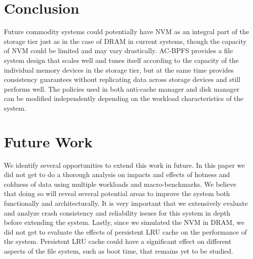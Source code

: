 \section{Conclusion}
\label{sec-conc}

Future commodity systems could potentially have NVM as an integral part of the storage tier just as in the case of DRAM in current systems, though the capacity of NVM could be limited and may vary drastically. AC-BPFS provides a file system design that scales well and tunes itself according to the capacity of the individual memory devices in the storage tier, but at the same time provides consistency guarantees without replicating data across storage devices and still performs well. The policies used in both anti-cache manager and disk manager can be modified independently depending on the workload characteristics of the system.

\section{Future Work}
\label{sec-conc}

We identify several opportunities to extend this work in future. In this paper we did not get to do a thorough analysis on impacts and effects of hotness and coldness of data using multiple workloads and macro-benchmarks. We believe that doing so will reveal several potential areas to improve the system both functionally and architecturally. It is very important that we extensively evaluate and analyze crash consistency and reliability issues for this system in depth before extending the system. Lastly, since we simulated the NVM in DRAM, we did not get to evaluate the effects of persistent LRU cache on the performance of the system. Persistent LRU cache could have a significant effect on different aspects of the file system, such as boot time, that remains yet to be studied.
